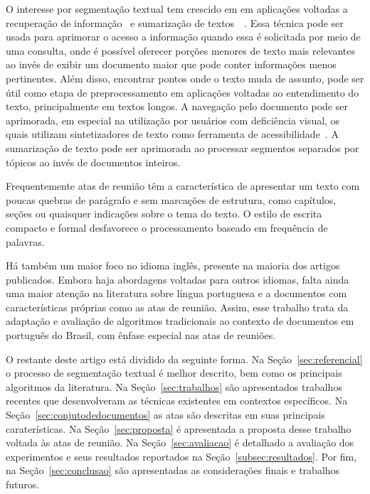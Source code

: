 O interesse por segmentação textual tem crescido em em aplicações voltadas a recuperação de informação~\cite{Reynar1999} %
e sumarização de textos~\cite{Boguraev2000}~\cite{Boguraev2000b}. %
Essa técnica pode ser usada para aprimorar o acesso a informação quando essa é solicitada por meio de uma consulta, onde é possível oferecer porções menores de texto mais relevantes ao invés de exibir um documento maior que pode conter informações menos pertinentes. 
%
Além disso, encontrar pontos onde o texto muda de assunto, pode ser útil como etapa de preprocessamento em aplicações voltadas ao entendimento do texto, principalmente em textos longos.
%
A navegação pelo documento pode ser aprimorada, em especial na utilização por usuários com deficiência visual, os quais utilizam  sintetizadores de texto como ferramenta de acessibilidade~\cite{Choi2000}. 
%
A sumarização de texto pode ser aprimorada ao processar segmentos separados por tópicos ao invés de documentos inteiros. 



Frequentemente atas de reunião têm a característica de apresentar um texto com poucas quebras de parágrafo e sem marcações de estrutura, como capítulos, seções ou quaisquer indicações sobre o tema do texto. O estilo de escrita compacto e formal desfavorece o processamento baseado em frequência de palavras.


Há também um maior foco no idioma inglês, presente na maioria dos artigos publicados. Embora haja abordagens voltadas para outros idiomas, falta ainda uma maior atenção na literatura sobre língua portuguesa e a documentos com características próprias como as atas de reunião.
%
%
%
Assim, esse trabalho trata da adaptação e avaliação de algoritmos tradicionais ao contexto de documentos em português do Brasil, com ênfase especial nas atas de reuniões.

O restante deste artigo está dividido da seguinte forma. 
%
Na Seção~\ref{sec:referencial} o processo de segmentação textual é melhor descrito, bem como os principais algoritmos da literatura. 
%
Na Seção~\ref{sec:trabalhos} são apresentados trabalhos recentes que desenvolveram as técnicas existentes em contextos específicos. 
%
Na Seção~\ref{sec:conjutodedocumentos} as atas são descritas em suas principais caraterísticas.
%
Na Seção~\ref{sec:proposta} é apresentada a proposta desse trabalho voltada às atas de reunião. 
Na Seção~\ref{sec:avaliacao} é detalhado a avaliação dos experimentos e seus resultados reportados na Seção~\ref{subsec:resultados}. 
%
Por fim, na Seção~\ref{sec:conclusao} são apresentadas as considerações finais e trabalhos futuros.




